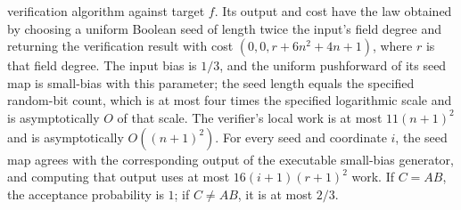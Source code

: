 \begin{theorem}
verification algorithm against target $f$. Its output and cost have the law obtained by
choosing a uniform Boolean seed of length twice the input's field degree and returning
the verification result with cost $(0,0,r+6n^2+4n+1)$, where $r$ is that field degree.
The input bias is $1/3$, and the uniform pushforward of its seed map is small-bias with
this parameter; the seed length equals the specified random-bit count, which is at most
four times the specified logarithmic scale and is asymptotically $O$ of that scale. The
verifier's local work is at most $11(n+1)^2$ and is asymptotically $O((n+1)^2)$. For
every seed and coordinate $i$, the seed map agrees with the corresponding output of the
executable small-bias generator, and computing that output uses at most $16(i+1)(r+1)^2$
work. If $C=AB$, the acceptance probability is $1$; if $C\ne AB$, it is at most $2/3$.
\end{theorem}
